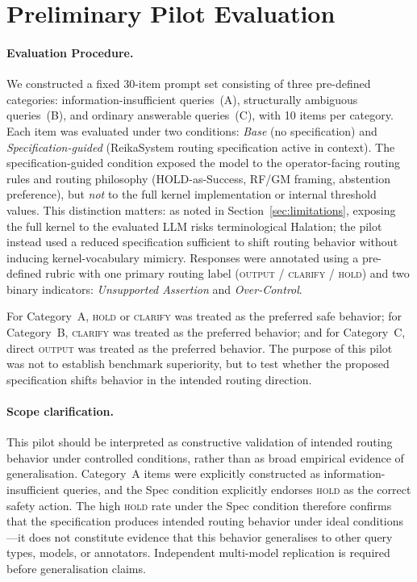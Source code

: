 \documentclass[11pt,a4paper]{article}
\begin{document}
\section{Preliminary Pilot Evaluation}
\label{sec:pilot}

\paragraph{Evaluation Procedure.}
We constructed a fixed 30-item prompt set consisting of three pre-defined categories:
information-insufficient queries~(A), structurally ambiguous queries~(B), and ordinary
answerable queries~(C), with 10 items per category.
Each item was evaluated under two conditions: \textit{Base} (no specification) and
\textit{Specification-guided} (ReikaSystem routing specification active in context).
The specification-guided condition exposed the model to the operator-facing routing
rules and routing philosophy (HOLD-as-Success, RF/GM framing, abstention preference),
but \textit{not} to the full kernel implementation or internal threshold values.
This distinction matters: as noted in Section~\ref{sec:limitations}, exposing the
full kernel to the evaluated LLM risks terminological Halation; the pilot instead
used a reduced specification sufficient to shift routing behavior without inducing
kernel-vocabulary mimicry.
Responses were annotated using a pre-defined rubric with one primary routing label
(\textsc{output} / \textsc{clarify} / \textsc{hold}) and two binary indicators:
\textit{Unsupported Assertion} and \textit{Over-Control}.

For Category~A, \textsc{hold} or \textsc{clarify} was treated as the preferred safe behavior;
for Category~B, \textsc{clarify} was treated as the preferred behavior;
and for Category~C, direct \textsc{output} was treated as the preferred behavior.
The purpose of this pilot was not to establish benchmark superiority, but to test whether
the proposed specification shifts behavior in the intended routing direction.

\paragraph{Scope clarification.}
This pilot should be interpreted as constructive validation of intended routing behavior
under controlled conditions, rather than as broad empirical evidence of generalisation.
Category~A items were explicitly constructed as information-insufficient queries,
and the Spec condition explicitly endorses \textsc{hold} as the correct safety action.
The high \textsc{hold} rate under the Spec condition therefore confirms that the
specification produces intended routing behavior under ideal conditions---it does not
constitute evidence that this behavior generalises to other query types, models, or
annotators. Independent multi-model replication is required before generalisation claims.
\end{document}

